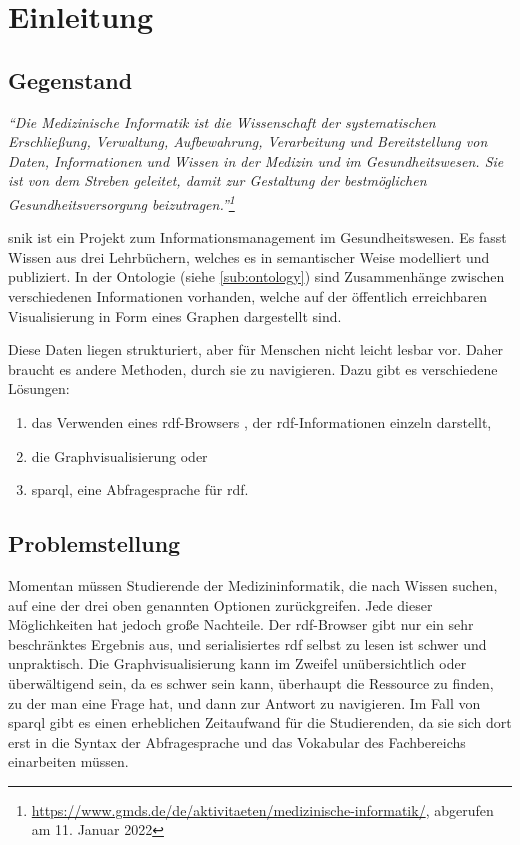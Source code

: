 \chapter{Einleitung}\label{ch:introduction}

\section{Gegenstand}
\begin{flushright}{\slshape
\enquote{Die Medizinische Informatik ist die Wissenschaft der systematischen Erschließung, Verwaltung, Aufbewahrung, Verarbeitung und Bereitstellung von Daten, Informationen und Wissen in der Medizin und im Gesundheitswesen.
Sie ist von dem Streben geleitet, damit zur Gestaltung der bestmöglichen Gesundheitsversorgung beizutragen.}\footnote{\url{https://www.gmds.de/de/aktivitaeten/medizinische-informatik/}, abgerufen am 11. Januar 2022}}
\end{flushright}
\acs{snik} ist ein Projekt zum Informationsmanagement im Gesundheitswesen.
Es fasst Wissen aus drei Lehrbüchern, welches es in semantischer Weise modelliert und publiziert.
In der Ontologie (siehe \cref{sub:ontology}) sind Zusammenhänge zwischen verschiedenen Informationen vorhanden,
welche auf der öffentlich erreichbaren Visualisierung in Form eines Graphen dargestellt sind.

Diese Daten liegen strukturiert, aber für Menschen nicht leicht lesbar vor.
Daher braucht es andere Methoden, durch sie zu navigieren.
Dazu gibt es verschiedene Lösungen:
\begin{enumerate}
	\item das Verwenden eines \acs{rdf}-Browsers \citep[S.~30]{linkeddatavisualisation}, der \acs{rdf}-Informationen einzeln darstellt,
	\item die Graphvisualisierung \citep[S.~32]{linkeddatavisualisation} oder
	\item \acs{sparql}, eine Abfragesprache für \acs{rdf}.
\end{enumerate}

\section{Problemstellung}\label{sec:problemstellung}

Momentan müssen Studierende der Medizininformatik, die nach Wissen suchen, auf eine der drei oben genannten Optionen zurückgreifen.
Jede dieser Möglichkeiten hat jedoch große Nachteile.
Der \acs*{rdf}-Browser gibt nur ein sehr beschränktes Ergebnis aus, und serialisiertes \acs*{rdf} selbst zu lesen ist schwer und unpraktisch.
Die Graphvisualisierung kann im Zweifel unübersichtlich oder überwältigend sein, da es schwer sein kann, überhaupt die Ressource zu finden, zu der man eine Frage hat, und dann zur Antwort zu navigieren.
Im Fall von \acs*{sparql} gibt es einen erheblichen Zeitaufwand für die Studierenden, da sie sich dort erst in die Syntax der Abfragesprache und das Vokabular des Fachbereichs einarbeiten müssen.

